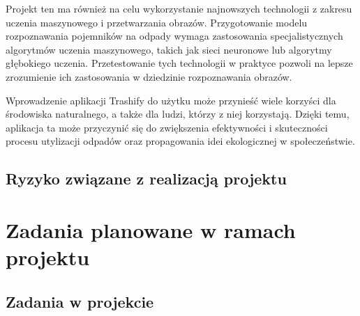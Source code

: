 \documentclass[12pt,oneside]{book}
\begin{document}
Projekt ten ma również na celu wykorzystanie najnowszych technologii z zakresu uczenia maszynowego i przetwarzania obrazów. Przygotowanie modelu rozpoznawania pojemników na odpady wymaga zastosowania specjalistycznych algorytmów uczenia maszynowego, takich jak sieci neuronowe lub algorytmy głębokiego uczenia. Przetestowanie tych technologii w praktyce pozwoli na lepsze zrozumienie ich zastosowania w dziedzinie rozpoznawania obrazów.

Wprowadzenie aplikacji Trashify do użytku może przynieść wiele korzyści dla środowiska naturalnego, a także dla ludzi, którzy z niej korzystają. Dzięki temu, aplikacja ta może przyczynić się do zwiększenia efektywności i skuteczności procesu utylizacji odpadów oraz propagowania idei ekologicznej w społeczeństwie.

\section{Ryzyko związane z realizacją projektu}

{\let\clearpage\relax\chapter{Zadania planowane w ramach projektu}}

\section{Zadania w projekcie}
\end{document}
